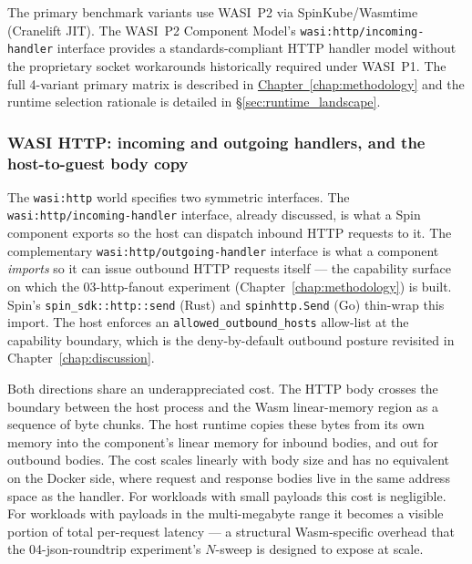 \begin{sloppypar}
The primary benchmark variants use \acs{WASI}~P2 via SpinKube/Wasmtime (Cranelift \acs{JIT}). The \acs{WASI}~P2 Component Model's \texttt{wasi:http/incoming-handler} interface provides a standards-compliant \acs{HTTP} handler model without the proprietary socket workarounds historically required under \acs{WASI}~P1. The full 4-variant primary matrix is described in \hyperref[chap:methodology]{Chapter~\ref{chap:methodology}} and the runtime selection rationale is detailed in \S\ref{sec:runtime_landscape}.
\end{sloppypar}

\subsubsection{WASI HTTP: incoming and outgoing handlers, and the host-to-guest body copy}
\begin{sloppypar}
The \texttt{wasi:http} world specifies two symmetric interfaces. The \texttt{wasi:http/incoming-handler} interface, already discussed, is what a Spin component exports so the host can dispatch inbound \acs{HTTP} requests to it. The complementary \texttt{wasi:http/outgoing-handler} interface is what a component \emph{imports} so it can issue outbound \acs{HTTP} requests itself --- the capability surface on which the 03-http-fanout experiment (Chapter~\ref{chap:methodology}) is built. Spin's \texttt{spin\_sdk::http::send} (Rust) and \texttt{spinhttp.Send} (Go) thin-wrap this import. The host enforces an \texttt{allowed\_outbound\_hosts} allow-list at the capability boundary, which is the deny-by-default outbound posture revisited in Chapter~\ref{chap:discussion}.
\end{sloppypar}

Both directions share an underappreciated cost. The \acs{HTTP} body crosses the boundary between the host process and the Wasm linear-memory region as a sequence of byte chunks. The host runtime copies these bytes from its own memory into the component's linear memory for inbound bodies, and out for outbound bodies. The cost scales linearly with body size and has no equivalent on the Docker side, where request and response bodies live in the same address space as the handler. For workloads with small payloads this cost is negligible. For workloads with payloads in the multi-megabyte range it becomes a visible portion of total per-request latency --- a structural Wasm-specific overhead that the 04-json-roundtrip experiment's $N$-sweep is designed to expose at scale.

